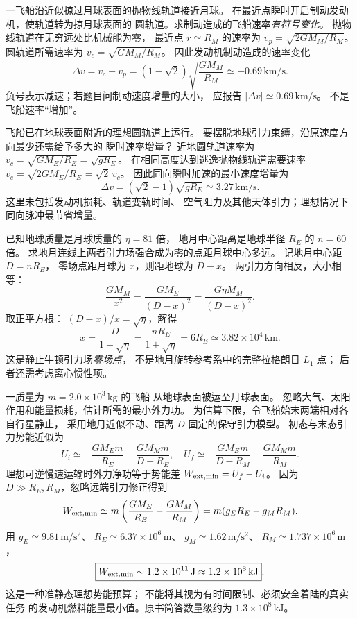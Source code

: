 一飞船沿近似掠过月球表面的抛物线轨道接近月球。
在最近点瞬时开启制动发动机，使轨道转为掠月球表面的
圆轨道。求制动造成的飞船速率\emph{有符号变化}。
\exsolution
抛物线轨道在无穷远处比机械能为零，
最近点 $r\simeq R_M$ 的速率为
$v_p=\sqrt{2GM_M/R_M}$。
圆轨道所需速率为
$v_c=\sqrt{GM_M/R_M}$。
因此发动机制动造成的速率变化
\[
\boxed{\Delta v=v_c-v_p
=(1-\sqrt2)\sqrt{\frac{GM_M}{R_M}}
\simeq-0.69\,\mathrm{km/s}}.
\]
\excheck 负号表示减速；若题目问制动速度增量的大小，
应报告 $|\Delta v|\simeq0.69\,\mathrm{km/s}$。
不是飞船速率“增加”。

飞船已在地球表面附近的理想圆轨道上运行。
要摆脱地球引力束缚，沿原速度方向最少还需给予多大的
瞬时速率增量？
\exsolution
近地圆轨道速率为
$v_c=\sqrt{GM_E/R_E}=\sqrt{gR_E}$。
在相同高度达到逃逸抛物线轨道需要速率
$v_e=\sqrt{2GM_E/R_E}=\sqrt2\,v_c$。
因此同向瞬时加速的最小速度增量为
\[
\boxed{\Delta v=(\sqrt2-1)\sqrt{gR_E}
\simeq3.27\,\mathrm{km/s}}.
\]
\excheck 这里未包括发动机损耗、轨道变轨时间、
空气阻力及其他天体引力；理想情况下同向脉冲最节省增量。

已知地球质量是月球质量的 $\eta=81$ 倍，
地月中心距离是地球半径 $R_E$ 的 $n=60$ 倍。
求地月连线上两者引力场强合成为零的点距月球中心多远。
\exsolution
记地月中心距 $D=nR_E$，
零场点距月球为 $x$，则距地球为 $D-x$。
两引力方向相反，大小相等：
\[
\frac{GM_M}{x^2}=\frac{GM_E}{(D-x)^2}
=\frac{G\eta M_M}{(D-x)^2}.
\]
取正平方根：
$(D-x)/x=\sqrt\eta$，解得
\[
\boxed{x=\frac{D}{1+\sqrt\eta}
=\frac{nR_E}{1+\sqrt\eta}
=6R_E\simeq3.82\times10^4\,\mathrm{km}}.
\]
\excheck 这是静止牛顿引力场\emph{零场点}，
不是地月旋转参考系中的完整拉格朗日 $L_1$ 点；
后者还需考虑离心惯性项。

一质量为 $m=2.0\times10^3\,\mathrm{kg}$ 的飞船
从地球表面被运至月球表面。
忽略大气、太阳作用和能量损耗，估计所需的最小外力功。
\exsolution
为估算下限，令飞船始末两端相对各自行星静止，
采用地月近似不动、距离 $D$ 固定的保守引力模型。
初态与末态引力势能近似为
\[
U_i\simeq-\frac{GM_E m}{R_E}
-\frac{GM_Mm}{D-R_E},\quad
U_f\simeq-\frac{GM_E m}{D-R_M}
-\frac{GM_Mm}{R_M}.
\]
理想可逆慢速运输时外力净功等于势能差
$W_{\rm ext,min}=U_f-U_i$。
因为 $D\gg R_E,R_M$，忽略远端引力修正得到
\[
W_{\rm ext,min}\simeq
m\left(\frac{GM_E}{R_E}-\frac{GM_M}{R_M}\right)
=m(g_ER_E-g_MR_M).
\]
用 $g_E\simeq9.81\,\mathrm{m/s^2}$、
$R_E\simeq6.37\times10^6\,\mathrm m$、
$g_M\simeq1.62\,\mathrm{m/s^2}$、
$R_M\simeq1.737\times10^6\,\mathrm m$，
\[
\boxed{W_{\rm ext,min}\sim1.2\times10^{11}\,\mathrm J
\approx1.2\times10^8\,\mathrm{kJ}}.
\]
\excheck 这是一种准静态理想势能预算；
不能将其视为有时间限制、必须安全着陆的真实任务
的发动机燃料能量最小值。原书简答数量级约为
$1.3\times10^8\,\mathrm{kJ}$。

